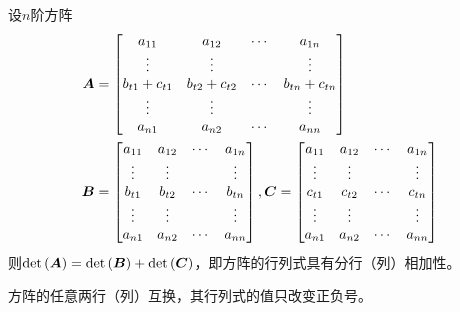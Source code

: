 \documentclass{ctexart}
\begin{document}
\begin{property}
    设\(n\)阶方阵
    \begin{align*}
        \boldsymbol{A} & =\begin{bmatrix}
                     a_{11}        & a_{12}        & \cdots & a_{1n}        \\
                     \vdots        & \vdots        &        & \vdots        \\
                     b_{t1}+c_{t1} & b_{t2}+c_{t2} & \cdots & b_{tn}+c_{tn} \\
                     \vdots        & \vdots        &        & \vdots        \\
                     a_{n1}        & a_{n2}        & \cdots & a_{nn}
                 \end{bmatrix} \\
        \boldsymbol{B} & =\begin{bmatrix}
                     a_{11} & a_{12} & \cdots & a_{1n} \\
                     \vdots & \vdots &        & \vdots \\
                     b_{t1} & b_{t2} & \cdots & b_{tn} \\
                     \vdots & \vdots &        & \vdots \\
                     a_{n1} & a_{n2} & \cdots & a_{nn}
                 \end{bmatrix},\boldsymbol{C}=\begin{bmatrix}
                                         a_{11} & a_{12} & \cdots & a_{1n} \\
                                         \vdots & \vdots &        & \vdots \\
                                         c_{t1} & c_{t2} & \cdots & c_{tn} \\
                                         \vdots & \vdots &        & \vdots \\
                                         a_{n1} & a_{n2} & \cdots & a_{nn}
                                     \end{bmatrix}
    \end{align*}
    则\(\mathrm{det}\left( \boldsymbol{A} \right)=\mathrm{det}\left( \boldsymbol{B} \right)+\mathrm{det}\left( \boldsymbol{C} \right)\)，即方阵的行列式具有分行（列）相加性。
\end{property}

\begin{property}
    方阵的任意两行（列）互换，其行列式的值只改变正负号。
\end{property}
\end{document}
